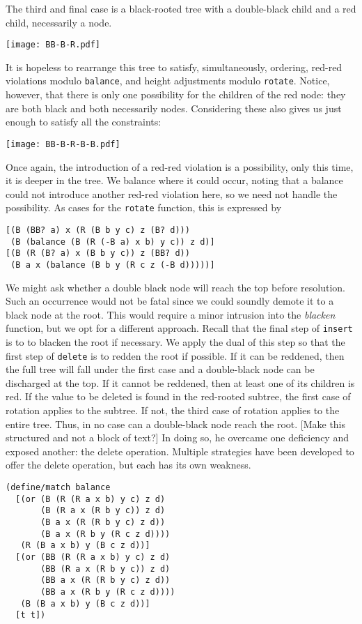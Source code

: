 \documentclass[preprint]{sigplanconf}
\begin{document}
The third and final case is a black-rooted tree with a double-black child and a red child, necessarily a node.
\begin{center}
\texttt{[image: BB-B-R.pdf]}
\end{center}
It is hopeless to rearrange this tree to satisfy, simultaneously, ordering, red-red violations modulo \texttt{balance}, and height adjustments modulo \texttt{rotate}. Notice, however, that there is only one possibility for the children of the red node: they are both black and both necessarily nodes. Considering these also gives us just enough to satisfy all the constraints:
\begin{center}
\texttt{[image: BB-B-R-B-B.pdf]}
\end{center}
Once again, the introduction of a red-red violation is a possibility, only this time, it is deeper in the tree. We balance where it could occur, noting that a balance could not introduce another red-red violation here, so we need not handle the possibility. As cases for the \texttt{rotate} function, this is expressed by
\begin{verbatim}
[(B (BB? a) x (R (B b y c) z (B? d)))
 (B (balance (B (R (-B a) x b) y c)) z d)]
[(B (R (B? a) x (B b y c)) z (BB? d))
 (B a x (balance (B b y (R c z (-B d)))))]
\end{verbatim}

We might ask whether a double black node will reach the top before resolution. Such an occurrence would not be fatal since we could soundly demote it to a black node at the root. This would require a minor intrusion into the \emph{blacken} function, but we opt for a different approach. Recall that the final step of \texttt{insert} is to to blacken the root if necessary. We apply the dual of this step so that the first step of \texttt{delete} is to redden the root if possible. If it can be reddened, then the full tree will fall under the first case and a double-black node can be discharged at the top. If it cannot be reddened, then at least one of its children is red. If the value to be deleted is found in the red-rooted subtree, the first case of rotation applies to the subtree. If not, the third case of rotation applies to the entire tree. Thus, in no case can a double-black node reach the root. [Make this structured and not a block of text?]
In doing so, he overcame one deficiency and exposed another: the delete operation. Multiple strategies have been developed to offer the delete operation, but each has its own weakness.

\begin{verbatim}
(define/match balance
  [(or (B (R (R a x b) y c) z d)
       (B (R a x (R b y c)) z d)
       (B a x (R (R b y c) z d))
       (B a x (R b y (R c z d))))
   (R (B a x b) y (B c z d))]
  [(or (BB (R (R a x b) y c) z d)
       (BB (R a x (R b y c)) z d)
       (BB a x (R (R b y c) z d))
       (BB a x (R b y (R c z d))))
   (B (B a x b) y (B c z d))]
  [t t])
\end{verbatim}
\end{document}
